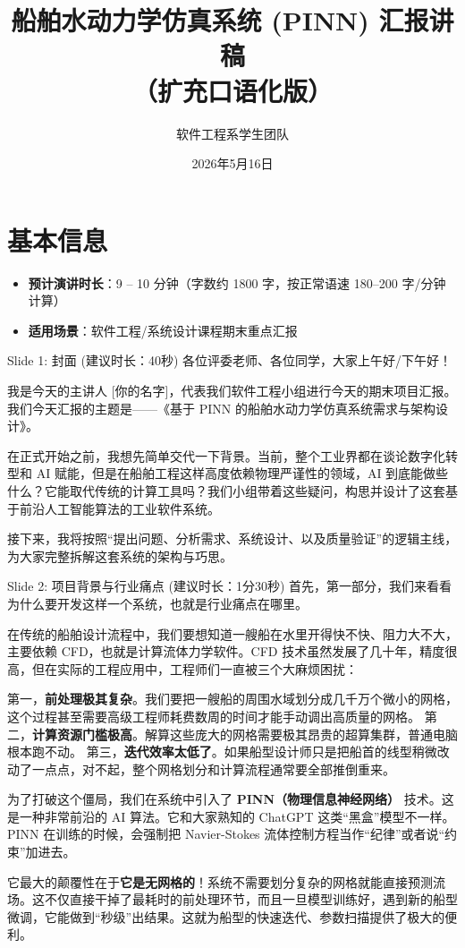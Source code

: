\documentclass[UTF8,11pt]{ctexart}
\title{\bfseries 船舶水动力学仿真系统 (PINN) 汇报讲稿 \\ \Large （扩充口语化版）}
\author{软件工程系学生团队}
\date{2026年5月16日}
\begin{document}
\maketitle

\section*{基本信息}
\begin{itemize}[label=--]
    \item \textbf{预计演讲时长}：9 -- 10 分钟（字数约 1800 字，按正常语速 180--200 字/分钟计算）
    \item \textbf{适用场景}：软件工程/系统设计课程期末重点汇报
\end{itemize}

\hrulefill

\begin{slidebox}{Slide 1: 封面 (建议时长：40秒)}
各位评委老师、各位同学，大家上午好/下午好！

我是今天的主讲人 [你的名字]，代表我们软件工程小组进行今天的期末项目汇报。我们今天汇报的主题是——《基于 PINN 的船舶水动力学仿真系统需求与架构设计》。

在正式开始之前，我想先简单交代一下背景。当前，整个工业界都在谈论数字化转型和 AI 赋能，但是在船舶工程这样高度依赖物理严谨性的领域，AI 到底能做些什么？它能取代传统的计算工具吗？我们小组带着这些疑问，构思并设计了这套基于前沿人工智能算法的工业软件系统。

接下来，我将按照“提出问题、分析需求、系统设计、以及质量验证”的逻辑主线，为大家完整拆解这套系统的架构与巧思。
\end{slidebox}

\begin{slidebox}{Slide 2: 项目背景与行业痛点 (建议时长：1分30秒)}
首先，第一部分，我们来看看为什么要开发这样一个系统，也就是行业痛点在哪里。

在传统的船舶设计流程中，我们要想知道一艘船在水里开得快不快、阻力大不大，主要依赖 CFD，也就是计算流体力学软件。CFD 技术虽然发展了几十年，精度很高，但在实际的工程应用中，工程师们一直被三个大麻烦困扰：

第一，\textbf{前处理极其复杂}。我们要把一艘船的周围水域划分成几千万个微小的网格，这个过程甚至需要高级工程师耗费数周的时间才能手动调出高质量的网格。
第二，\textbf{计算资源门槛极高}。解算这些庞大的网格需要极其昂贵的超算集群，普通电脑根本跑不动。
第三，\textbf{迭代效率太低了}。如果船型设计师只是把船首的线型稍微改动了一点点，对不起，整个网格划分和计算流程通常要全部推倒重来。

为了打破这个僵局，我们在系统中引入了 \textbf{PINN（物理信息神经网络）} 技术。这是一种非常前沿的 AI 算法。它和大家熟知的 ChatGPT 这类“黑盒”模型不一样。PINN 在训练的时候，会强制把 Navier-Stokes 流体控制方程当作“纪律”或者说“约束”加进去。

它最大的颠覆性在于\textbf{它是无网格的}！系统不需要划分复杂的网格就能直接预测流场。这不仅直接干掉了最耗时的前处理环节，而且一旦模型训练好，遇到新的船型微调，它能做到“秒级”出结果。这就为船型的快速迭代、参数扫描提供了极大的便利。
\end{slidebox}
\end{document}

